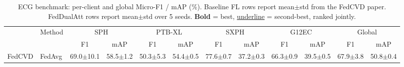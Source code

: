 \documentclass[conference]{IEEEtran}
\renewcommand{\arraystretch}{1.5}
\renewcommand{\arraystretch}{1.5}
\begin{document}
{\begin{table}[!t]
  \renewcommand{\arraystretch}{1.2}
  \centering
  \caption{ECG benchmark: per-client and global Micro-F1 / mAP (\%).
    Baseline FL rows report mean$\pm$std from the FedCVD paper.
    FedDualAtt rows report mean$\pm$std over 5 seeds.
    \textbf{Bold} = best, \underline{underline} = second-best, ranked jointly.}
  \label{tab:main}
  \begin{tabular}{|c|l|cc|cc|cc|cc|cc|}
    \hline
    \multirow{2}{*}{} & \multirow{2}{*}{Method}
      & \multicolumn{2}{c|}{SPH}
      & \multicolumn{2}{c|}{PTB-XL}
      & \multicolumn{2}{c|}{SXPH}
      & \multicolumn{2}{c|}{G12EC}
      & \multicolumn{2}{c|}{Global} \\
    \cline{3-12}
    & & F1 & mAP & F1 & mAP & F1 & mAP & F1 & mAP & F1 & mAP \\
    \hline
    \multirow{5}{*}{FedCVD} & FedAvg  & 69.0{\scriptsize$\pm$10.1} & 58.5{\scriptsize$\pm$1.2} & 50.3{\scriptsize$\pm$5.3} & 54.4{\scriptsize$\pm$0.5} & 77.6{\scriptsize$\pm$0.7} & 37.2{\scriptsize$\pm$0.3} & 66.3{\scriptsize$\pm$0.9} & 39.5{\scriptsize$\pm$0.5} & 67.9{\scriptsize$\pm$3.8} & 50.8{\scriptsize$\pm$0.4} \\

\end{tabular}
\end{table}}
\end{document}
